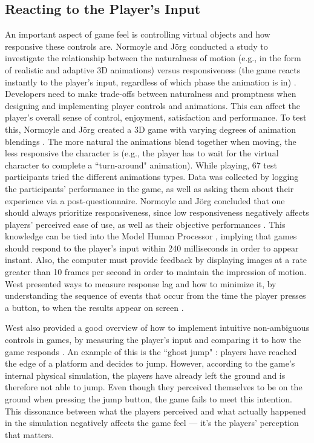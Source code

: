 \subsection{Reacting to the Player's Input}
An important aspect of game feel is controlling virtual objects and how responsive these controls are. Normoyle and J\"{o}rg conducted a study to investigate the relationship between the naturalness of motion (e.g., in the form of realistic and adaptive 3D animations) versus responsiveness (the game reacts instantly to the player's input, regardless of which phase the animation is in) \cite{normoyle_trade-offs_2014}. Developers need to make trade-offs between naturalness and promptness when designing and implementing player controls and animations. This can affect the player's overall sense of control, enjoyment, satisfaction and performance. To test this, Normoyle and J\"{o}rg  created a 3D game with varying degrees of animation blendings \cite{normoyle_trade-offs_2014}. The more natural the animations blend together when moving, the less responsive the character is (e.g., the player has to wait for the virtual character to complete a ``turn-around" animation). While playing, 67 test participants tried the different animations types.  Data was collected by logging the participants' performance in the game, as well as asking them about their experience via a post-questionnaire. Normoyle and J\"{o}rg concluded that one should always prioritize responsiveness, since low responsiveness negatively affects players' perceived ease of use, as well as their objective performances \cite{normoyle_trade-offs_2014}. This knowledge can be tied into the Model Human Processor \cite{card1986model}, implying that games should respond to the player's input within 240 milliseconds in order to appear instant. Also, the computer must provide feedback by displaying images at a rate greater than 10 frames per second in order to maintain the impression of motion. West presented ways to measure response lag and how to minimize it, by understanding the sequence of events that occur from the time the player presses a button, to when the results appear on screen \cite{measure_lag, program_lag}.

West also provided a good overview of how to implement intuitive non-ambiguous controls in games, by measuring the player's input and comparing it to how the game responds \cite{intuitive_buttons}. An example of this is the ``ghost jump" \cite{ghostJump, canabalt}: players have reached the edge of a platform and decides to jump. However, according to the game's internal physical simulation, the players have already left the ground and is therefore not able to jump. Even though they perceived themselves to be on the ground when pressing the jump button, the game fails to meet this intention. This dissonance between what the players perceived and what actually happened in the simulation negatively affects the game feel --- it's the players' perception that matters. 


